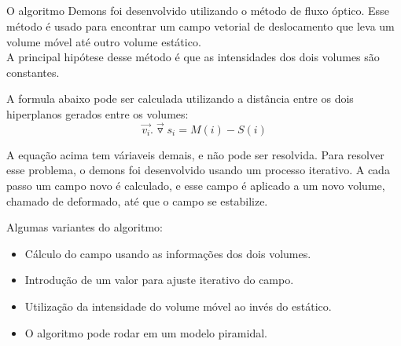 \documentclass[t]{beamer}
\begin{document}
\subsection{}
\begin{frame}
  O algoritmo Demons foi desenvolvido utilizando o método de fluxo óptico. Esse método é usado para encontrar um campo vetorial de deslocamento que leva
  um volume móvel até outro volume estático. \\
  A principal hipótese desse método é que as intensidades dos dois volumes são constantes.
\end{frame}

\begin{frame}
  A formula abaixo pode ser calculada utilizando a distância entre os dois hiperplanos gerados entre os volumes: \\
  \begin{equation*}
    \overrightarrow{v_i} . \overrightarrow{\triangledown}s_i = M(i) - S(i)
  \end{equation*}
\end{frame}

\begin{frame}
  A equação acima tem váriaveis demais, e não pode ser resolvida. Para resolver esse problema, o demons foi desenvolvido usando um processo
  iterativo. A cada passo um campo novo é calculado, e esse campo é aplicado a um novo volume, chamado de deformado, até que o campo se estabilize.
\end{frame}

\begin{frame}
  Algumas variantes do algoritmo:
  \begin{itemize}
    \item Cálculo do campo usando as informações dos dois volumes.
    \item Introdução de um valor para ajuste iterativo do campo.
    \item Utilização da intensidade do volume móvel ao invés do estático. 
    \item O algoritmo pode rodar em um modelo piramidal. 
  \end{itemize}
\end{frame}

\end{document}
